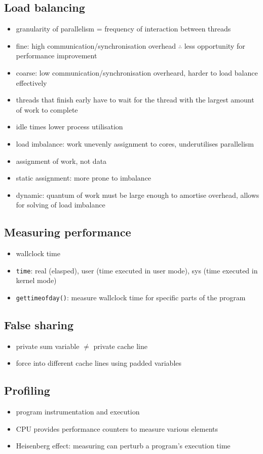 \documentclass[10pt, multicolumn, a4paper]{article}
\begin{document}
\begin{multicols}{2}
	\subsection*{Load balancing}
	\begin{itemize}
	\item granularity of parallelism = frequency of interaction between threads
	\item fine: high communication/synchronisation overhead $\therefore$ less opportunity for performance improvement
	\item coarse: low communication/synchronisation overheard, harder to load balance effectively
	\item threads that finish early have to wait for the thread with the largest amount of work to complete
	\item idle times lower process utilisation
	\item load imbalance: work unevenly assignment to cores, underutilises parallelism
	\item assignment of work, not data
	\item static assignment: more prone to imbalance
	\item dynamic: quantum of work must be large enough to amortise overhead, allows for solving of load imbalance
	\end{itemize}
	\subsection*{Measuring performance}
	\begin{itemize}
	\item wallclock time
	\item \verb|time|: real (elasped), user (time executed in user mode), sys (time executed in kernel mode)
	\item \verb|gettimeofday()|: measure wallclock time for specific parts of the program
	\end{itemize}
	\subsection*{False sharing}
	\begin{itemize}
	\item private sum variable $\neq$ private cache line
	\item force into different cache lines using padded variables
	\end{itemize}
	\subsection*{Profiling}
	\begin{itemize}
	\item program instrumentation and execution
	\item CPU provides performance counters to measure various elements
	\item Heisenberg effect: measuring can perturb a program's execution time
	\end{itemize}

\end{multicols}
\end{document}
